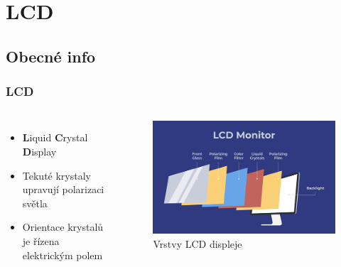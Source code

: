 \documentclass[aspectratio=169,11pt, allowframebreak=0.9]{beamer}
\begin{document}
\section{LCD}
\subsection{Obecné info}
\begin{frame}
\frametitle{LCD}
\begin{columns}
\begin{itemize}
    \item \textbf{L}iquid \textbf{C}rystal \textbf{D}isplay
    \item Tekuté krystaly upravují polarizaci světla
    \item Orientace krystalů je řízena elektrickým polem
\end{itemize}
\begin{figure}
    \centering
    \includegraphics[width=1\textwidth]{lcd.png}
    \caption{Vrstvy LCD displeje}
\end{figure}
\end{columns}
\end{frame}
\end{document}
